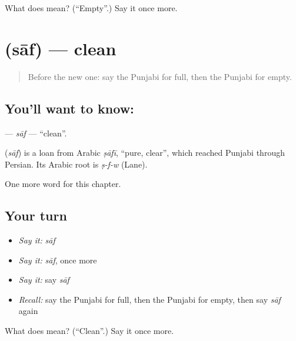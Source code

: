 \begin{tcolorbox}[breakable,colback=teal!4,colframe=teal!35!black,title={Before you move on}]
What does  mean? (\textquotedblleft{}Empty\textquotedblright{}.) Say it once more.
\end{tcolorbox}
\section[\texorpdfstring{\pa{ਸਾਫ਼} (sāf)}{ਸਾਫ਼ (sāf)}]{ (sāf) — clean}

\label{lesson:PA-C82-saf}



\begin{quote}
Before the new one: say the Punjabi for full, then the Punjabi for empty.
\end{quote}

\subsection*{You'll want to know: }
\textbf{} — \emph{sāf} — \textquotedblleft{}clean\textquotedblright{}.

\begin{cousinweb}
\textbf{} (\emph{sāf}) is a loan from Arabic \emph{ṣāfī}, \textquotedblleft{}pure, clear\textquotedblright{}, which reached Punjabi through Persian. Its Arabic root is \emph{ṣ-f-w} (Lane).
\end{cousinweb}

\begin{grammarlens}[title={What you've built}]
One more word for this chapter.
\end{grammarlens}

\subsection*{Your turn}
\begin{itemize}
\raggedright
  \item \emph{Say it:} \emph{sāf}
  \item \emph{Say it:} \emph{sāf}, once more
  \item \emph{Say it:} say \emph{sāf}
  \item \emph{Recall:} say the Punjabi for full, then the Punjabi for empty, then say \emph{sāf} again
\end{itemize}

\begin{tcolorbox}[breakable,colback=teal!4,colframe=teal!35!black,title={Before you move on}]
What does  mean? (\textquotedblleft{}Clean\textquotedblright{}.) Say it once more.
\end{tcolorbox}
